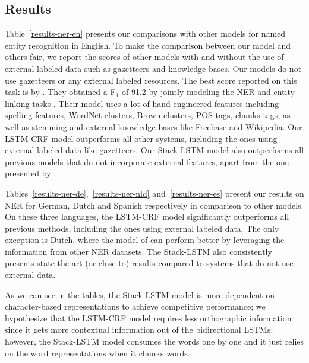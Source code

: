 \documentclass[11pt,letterpaper]{article}
\newcommand{\ignore}[1]{}
\newcommand{\miguelcomment}[1]{\ignore{\textcolor{red}{\textbf{[#1 --\textsc{MB}]}}}}
\newcommand{\guillaumecomment}[1]{\ignore{\textcolor{orange}{\textbf{[#1 --\textsc{GL}]}}}}
\begin{document}
\subsection{Results}
Table~\ref{results-ner-en} presents our comparisons with other models for named entity recognition in English. To make the comparison between our model and others fair, we report the scores of other models with and without the use of external labeled data such as gazetteers and knowledge bases. Our models do not use gazetteers or any external labeled resources. The best score reported on this task is by . They obtained a F$_1$ of 91.2\ignore{let's decide that later\guillaumecomment{I disagree, maybe they just have 91.15} \miguelcomment{is there any difference?}} by jointly modeling the NER and entity linking tasks \cite{hoffart2011robust}. Their model uses a lot of hand-engineered features including spelling features, WordNet clusters, Brown clusters, POS tags, chunks tags, as well as stemming and external knowledge bases like Freebase and Wikipedia. Our LSTM-CRF model outperforms all other systems, including the ones using external labeled data like gazetteers. Our Stack-LSTM model also outperforms all previous models that do not incorporate external features, apart from the one presented by .

Tables~\ref{results-ner-de},~\ref{results-ner-nld} and~\ref{results-ner-es} present our results on NER for German, Dutch and Spanish respectively in comparison to other models. On these three languages, the LSTM-CRF model significantly outperforms all previous methods, including the ones using external labeled data. The only exception is Dutch, where the model of  can perform better by leveraging the information from other NER datasets. The Stack-LSTM also consistently presents state-the-art (or close to) results compared to systems that do not use external data.

As we can see in the tables, the Stack-LSTM model is more dependent on character-based representations to achieve competitive performance; we hypothesize that the LSTM-CRF model requires less orthographic information since it gets more contextual information out of the bidirectional LSTMs; however, the Stack-LSTM model consumes the words one by one and it just relies on the word representations when it chunks words.

\ignore{
Table~\ref{results-chunk} compares different results on chunking. The models used by \cite{collobert2011natural} and \cite{huang:2015} are the same as the ones they used for English NER. \cite{shen2005voting} uses a majority vote on the output of different specialized HMMs trained on different tagging schemes (IOB1, IOB2, etc.).
}
\end{document}
